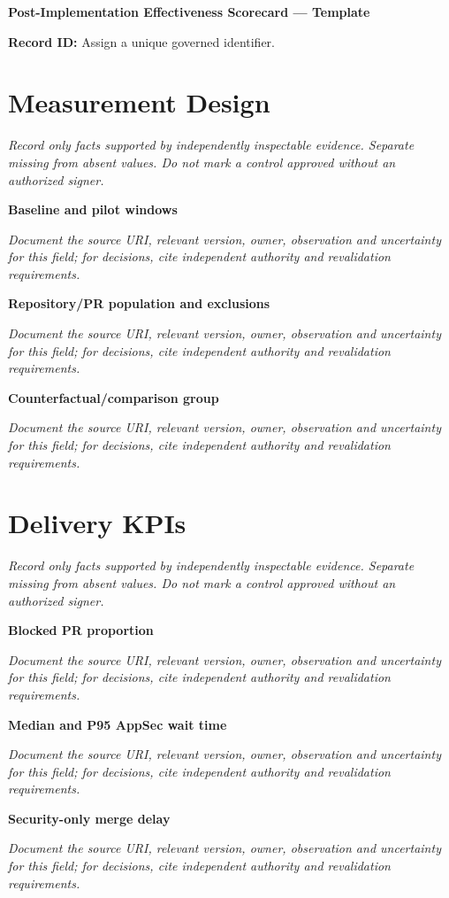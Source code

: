 \documentclass[11pt,letterpaper]{article}
\begin{document}
\begin{center}{\LARGE\bfseries Post-Implementation Effectiveness Scorecard --- Template}\par
\vspace{4pt}{\small Guided authoring instrument (not a completed assessment)}\par
\end{center}
\noindent\textbf{Record ID:} Assign a unique governed identifier.\par
\section{Measurement Design}
\noindent\emph{Record only facts supported by independently inspectable evidence. Separate missing from absent values. Do not mark a control approved without an authorized signer.}\par
\noindent\textbf{Baseline and pilot windows}\par
\noindent\emph{Document the source URI, relevant version, owner, observation and uncertainty for this field; for decisions, cite independent authority and revalidation requirements.}\par\medskip
\noindent\textbf{Repository/PR population and exclusions}\par
\noindent\emph{Document the source URI, relevant version, owner, observation and uncertainty for this field; for decisions, cite independent authority and revalidation requirements.}\par\medskip
\noindent\textbf{Counterfactual/comparison group}\par
\noindent\emph{Document the source URI, relevant version, owner, observation and uncertainty for this field; for decisions, cite independent authority and revalidation requirements.}\par\medskip
\section{Delivery KPIs}
\noindent\emph{Record only facts supported by independently inspectable evidence. Separate missing from absent values. Do not mark a control approved without an authorized signer.}\par
\noindent\textbf{Blocked PR proportion}\par
\noindent\emph{Document the source URI, relevant version, owner, observation and uncertainty for this field; for decisions, cite independent authority and revalidation requirements.}\par\medskip
\noindent\textbf{Median and P95 AppSec wait time}\par
\noindent\emph{Document the source URI, relevant version, owner, observation and uncertainty for this field; for decisions, cite independent authority and revalidation requirements.}\par\medskip
\noindent\textbf{Security-only merge delay}\par
\noindent\emph{Document the source URI, relevant version, owner, observation and uncertainty for this field; for decisions, cite independent authority and revalidation requirements.}\par\medskip
\end{document}
